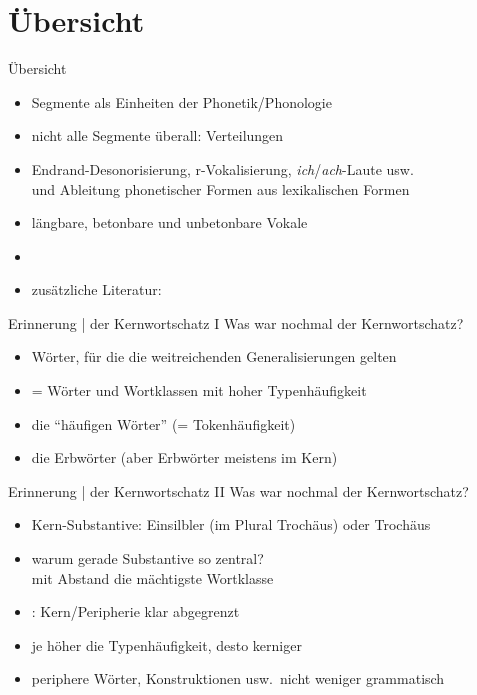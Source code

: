 \section{Übersicht}

\begin{frame}
  {Übersicht}
  \pause
  \begin{itemize}[<+->]
    \item \alert{Segmente} als Einheiten der Phonetik\slash Phonologie
    \item nicht alle Segmente überall: \alert{Verteilungen}
    \item Endrand-Desonorisierung, r-Vokalisierung, \textit{ich}\slash\textit{ach}-Laute usw.\\
      und \alert{Ableitung} phonetischer Formen aus lexikalischen Formen
    \item längbare, betonbare und unbetonbare Vokale
      \Zeile
    \item \citet[Abschnitt~5.1]{Schaefer2018b}
    \item zusätzliche Literatur: \citet{Eisenberg2013a}
  \end{itemize}
\end{frame}

\begin{frame}
  {Erinnerung | der Kernwortschatz I}
  \pause
  Was war nochmal der Kernwortschatz?\\
  \Halbzeile
  \pause
  \begin{itemize}[<+->]
    \item Wörter, für die \alert{die weitreichenden Generalisierungen gelten}
    \item = Wörter und Wortklassen mit \alert{hoher Typenhäufigkeit}
    \item {} die "`häufigen Wörter"' (= Tokenhäufigkeit)
    \item {} die Erbwörter (aber Erbwörter meistens im Kern)
  \end{itemize}
\end{frame}

\begin{frame}
  {Erinnerung | der Kernwortschatz II}
  \pause
  Was war nochmal der Kernwortschatz?\\
  \Halbzeile
  \pause
  \begin{itemize}[<+->]
    \item Kern-Substantive: Einsilbler (im Plural Trochäus) oder Trochäus
    \item warum gerade Substantive so zentral?\\
      \alert{mit Abstand die mächtigste Wortklasse}
      \Halbzeile
    \item {}: Kern\slash Peripherie klar abgegrenzt
    \item je höher die Typenhäufigkeit, desto kerniger
    \item periphere Wörter, Konstruktionen usw.\ \alert{nicht weniger grammatisch}
  \end{itemize}
\end{frame}


